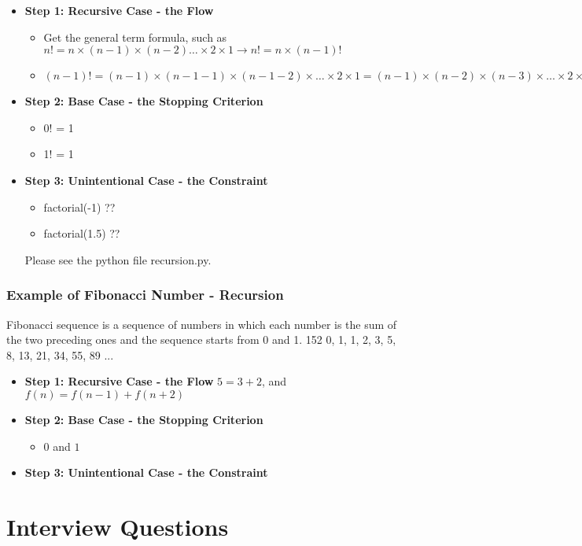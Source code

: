 \documentclass[10pt,letterpaper]{article}
\begin{document}
\begin{itemize}
\item \textbf{Step 1: Recursive Case - the Flow}
\begin{itemize}
\item Get the general term formula, such as $n!=n\times (n-1)\times (n-2)\ldots\times 2\times 1 \rightarrow n! = n\times (n-1)!$
\item $(n-1)!=(n-1)\times (n-1-1)\times (n-1-2)\times \ldots \times 2\times 1 = (n-1)\times (n-2)\times (n-3)\times \ldots \times 2 \times 1$
\end{itemize}

\item \textbf{Step 2: Base Case - the Stopping Criterion}
\begin{itemize}
\item 0! = 1
\item 1! = 1
\end{itemize}

\item \textbf{Step 3: Unintentional Case - the Constraint}
\begin{itemize}
\item factorial(-1) ??
\item factorial(1.5) ??
\end{itemize}
Please see the python file recursion.py.
\end{itemize}

\subsubsection{Example of Fibonacci Number - Recursion}
Fibonacci sequence is a sequence of numbers in which each number is the sum of the two preceding ones and the sequence starts from 0 and 1.
152 0, 1, 1, 2, 3, 5, 8, 13, 21, 34, 55, 89 ...
\begin{itemize}
\item \textbf{Step 1: Recursive Case - the Flow}
$5=3+2$, and $f(n)=f(n-1)+f(n+2)$
\item \textbf{Step 2: Base Case - the Stopping Criterion}
\begin{itemize}
\item $0$ and $1$
\end{itemize}
\item \textbf{Step 3: Unintentional Case - the Constraint}
\end{itemize}

\section{Interview Questions}
\end{document}

